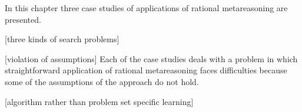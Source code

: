 In this chapter three case studies of applications of rational
metareasoning are presented.

[three kinds of search problems]

[violation of assumptions]
Each of the case studies deals with
a problem in which straightforward application of rational
metareasoning faces difficulties because some of the assumptions
of the approach do not hold. 

[algorithm rather than problem set specific learning]


